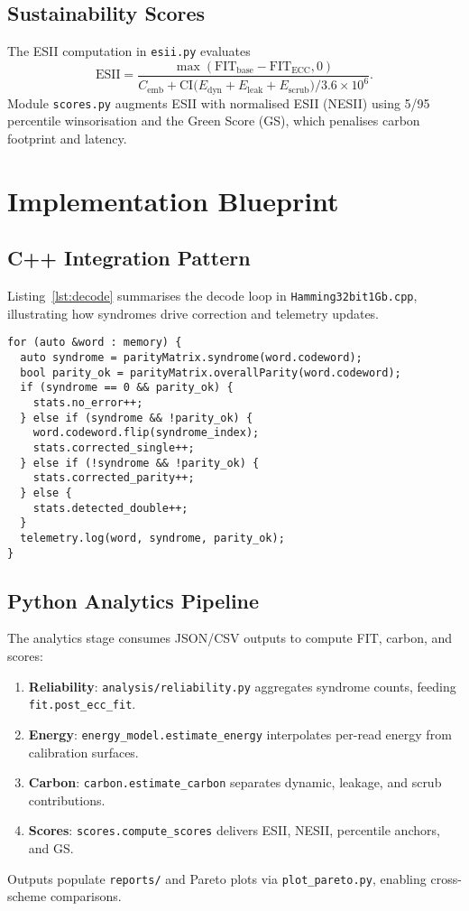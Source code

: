 \documentclass[conference]{IEEEtran}
\begin{document}
\subsection{Sustainability Scores}
The ESII computation in \texttt{esii.py} evaluates
\begin{equation}
    \text{ESII} = \frac{\max(\text{FIT}_{\text{base}}-\text{FIT}_{\text{ECC}},0)}{C_{\text{emb}} + \text{CI}\bigl(E_{\text{dyn}}+E_{\text{leak}}+E_{\text{scrub}}\bigr) / 3.6\times10^{6}}.
\end{equation}
Module \texttt{scores.py} augments ESII with normalised ESII (NESII) using 5/95 percentile winsorisation and the Green Score (GS), which penalises carbon footprint and latency.
\section{Implementation Blueprint}
\subsection{C++ Integration Pattern}
Listing~\ref{lst:decode} summarises the decode loop in \texttt{Hamming32bit1Gb.cpp}, illustrating how syndromes drive correction and telemetry updates.
\begin{lstlisting}[style=ecccode,caption={SEC-DED decode pathway excerpt},label={lst:decode}]
for (auto &word : memory) {
  auto syndrome = parityMatrix.syndrome(word.codeword);
  bool parity_ok = parityMatrix.overallParity(word.codeword);
  if (syndrome == 0 && parity_ok) {
    stats.no_error++;
  } else if (syndrome && !parity_ok) {
    word.codeword.flip(syndrome_index);
    stats.corrected_single++;
  } else if (!syndrome && !parity_ok) {
    stats.corrected_parity++;
  } else {
    stats.detected_double++;
  }
  telemetry.log(word, syndrome, parity_ok);
}
\end{lstlisting}
\subsection{Python Analytics Pipeline}
The analytics stage consumes JSON/CSV outputs to compute FIT, carbon, and scores:
\begin{enumerate}
    \item \textbf{Reliability}: \texttt{analysis/reliability.py} aggregates syndrome counts, feeding \texttt{fit.post\_ecc\_fit}.
    \item \textbf{Energy}: \texttt{energy\_model.estimate\_energy} interpolates per-read energy from calibration surfaces.
    \item \textbf{Carbon}: \texttt{carbon.estimate\_carbon} separates dynamic, leakage, and scrub contributions.
    \item \textbf{Scores}: \texttt{scores.compute\_scores} delivers ESII, NESII, percentile anchors, and GS.
\end{enumerate}
Outputs populate \texttt{reports/} and Pareto plots via \texttt{plot\_pareto.py}, enabling cross-scheme comparisons.
\end{document}
